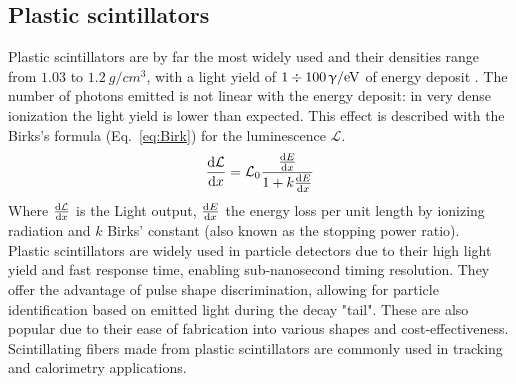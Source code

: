 \begin{refsection}
    \subsection{Plastic scintillators}
        Plastic scintillators are by far the most widely used and their densities range from $1.03$ to $\SI{1.2}{g\per cm^3}$, with a light yield of $1\divisionsymbol\SI{100}{\upgamma/eV}$ of energy deposit \cite{PDG}.
        The number of photons emitted is not linear with the energy deposit: in very dense ionization the light yield is lower than expected.
        This effect is described with the Birks's formula (Eq.~\ref{eq:Birk}) for the luminescence $\mathcal{L}$.
        \begin{equation}
            \dv{\mathcal{L}}{x} = \mathcal{L}_0 \frac{\dv{E}{x}}{1 + k \dv{E}{x}}
            \label{eq:Birk}
        \end{equation}
        Where $\dv{\mathcal{L}}{x}$ is the Light output, $\dv{E}{x}$ the energy loss per unit length by ionizing radiation and $k$ Birks' constant (also known as the stopping power ratio).\\
        Plastic scintillators are widely used in particle detectors due to their high light yield and fast response time, enabling sub-nanosecond timing resolution. 
        They offer the advantage of pulse shape discrimination, allowing for particle identification based on emitted light during the decay "tail".
        These are also popular due to their ease of fabrication into various shapes and cost-effectiveness. 
        Scintillating fibers made from plastic scintillators are commonly used in tracking and calorimetry applications.


\end{refsection}
